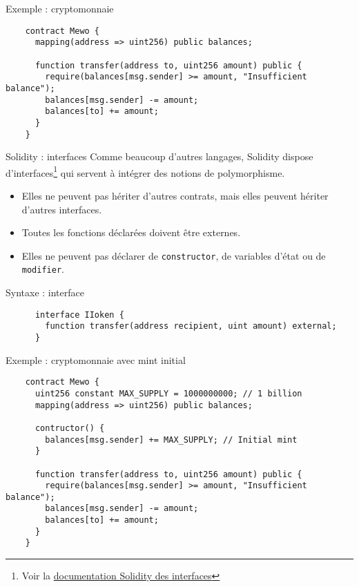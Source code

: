 \begin{frame}[fragile]{Exemple : cryptomonnaie}
  \begin{verbatim}
    contract Mewo {
      mapping(address => uint256) public balances;

      function transfer(address to, uint256 amount) public {
        require(balances[msg.sender] >= amount, "Insufficient balance");
        balances[msg.sender] -= amount;
        balances[to] += amount;
      }
    }
  \end{verbatim}
\end{frame}

\begin{frame}[fragile]{Solidity : interfaces}
  Comme beaucoup d'autres langages, Solidity dispose d'interfaces\footnote{Voir la \href{https://docs.soliditylang.org/fr/stable/contracts.html\#interfaces}{documentation Solidity des interfaces}} qui servent à intégrer des notions de polymorphisme.

  \begin{itemize}
    \item Elles ne peuvent pas hériter d'autres contrats, mais elles peuvent hériter d'autres interfaces.
    \item Toutes les fonctions déclarées doivent être externes.
    \item Elles ne peuvent pas déclarer de \texttt{constructor}, de variables d'état ou de \texttt{modifier}.
  \end{itemize}

  \begin{block}{Syntaxe : interface}
    \begin{verbatim}
      interface IIoken {
        function transfer(address recipient, uint amount) external;
      }
    \end{verbatim}
  \end{block}
\end{frame}

\begin{frame}[fragile]{Exemple : cryptomonnaie avec mint initial}
  \begin{verbatim}
    contract Mewo {
      uint256 constant MAX_SUPPLY = 1000000000; // 1 billion
      mapping(address => uint256) public balances;

      contructor() {
        balances[msg.sender] += MAX_SUPPLY; // Initial mint
      }

      function transfer(address to, uint256 amount) public {
        require(balances[msg.sender] >= amount, "Insufficient balance");
        balances[msg.sender] -= amount;
        balances[to] += amount;
      }
    }
  \end{verbatim}
\end{frame}

